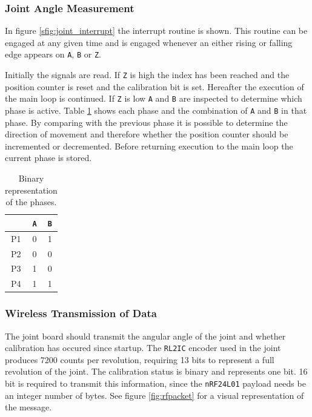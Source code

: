 \subsubsection{Joint Angle Measurement}
\label{ssub:joint_angle_measurement}
In figure \ref{sfig:joint_interrupt} the interrupt routine is shown.
This routine can be engaged at any given time and is engaged whenever an either rising or falling edge appears on \texttt{A}, \texttt{B} or \texttt{Z}.

Initially the signals are read.
If \texttt{Z} is high the index has been reached and the position counter is reset and the calibration bit is set.
Hereafter the execution of the main loop is continued.
If \texttt{Z} is low \texttt{A} and \texttt{B} are inspected to determine which phase is active.
Table \ref{tab:bin_phase} shows each phase and the combination of \texttt{A} and \texttt{B} in that phase.
By comparing with the previous phase it is possible to determine the direction of movement and therefore whether the position counter should be incremented or decremented.
Before returning execution to the main loop the current phase is stored. 

\begin{table}
	\centering
	\begin{tabular}{c | c  c}
		& \texttt{A} & \texttt{B}\\
		\hline
		P1 & 0 & 1\\
		P2 & 0 & 0\\
		P3 & 1 & 0\\
		P4 & 1 & 1
	\end{tabular}
	\caption{Binary representation of the phases.}
	\label{tab:bin_phase}
\end{table}

\subsubsection{Wireless Transmission of Data}
\label{ssub:wireless_transmission_of_data}
The joint board should transmit the angular angle of the joint and whether calibration has occured since startup.
The \texttt{RL2IC} encoder used in the joint produces 7200 counts per revolution, requiring 13 bits to represent a full revolution of the joint.
The calibration status is binary and represents one bit. 
16 bit is required to transmit this information, since the \texttt{nRF24L01} payload needs be an integer number of bytes.
See figure \ref{fig:rfpacket} for a visual representation of the message.

